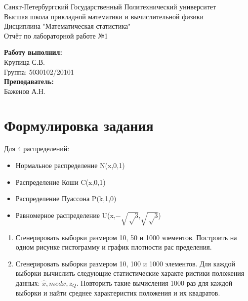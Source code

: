 \documentclass[12pt]{article}
\begin{document}
\begin{titlepage}	

	\begin{center}		

		Санкт-Петербургский Государственный Политехнический университет\\
		Высшая школа прикладной математики и вычислительной физики\\
		Дисциплина "Математическая статистика"\\[6cm]

		\huge {Отчёт по лабораторной работе №1} \\[6cm]


	\end{center} 
	\begin{flushright} 
		\begin{minipage}{0.3\textwidth} 
			\begin{flushleft} 

				\textbf{Работу выполнил:}\\
				{Крупица С.В.}\\
				{Группа:  5030102/20101} \\

				\textbf{Преподаватель:}\\
				{Баженов А.Н.}\\

			\end{flushleft}
		\end{minipage}
	\end{flushright}

	\vfill 
\end{titlepage}

\newpage
\tableofcontents
\newpage
\section{Формулировка задания}
Для 4 распределений:
\begin{itemize}
    \item Нормальное распределение N(x,0,1)
    \item Распределение Коши C(x,0,1)
    \item Распределение Пуассона P(k,1,0)
    \item Равномерное распределение U(x,$-\sqrt{√3}$,$\sqrt{√3}$)
    
\end{itemize}


\begin{enumerate}
    \item  Сгенерировать выборки размером 10, 50 и 1000 элементов.
 Построить на одном рисунке гистограмму и график плотности рас
пределения.
    \item Сгенерировать выборки размером 10, 100 и 1000 элементов.
 Для каждой выборки вычислить следующие статистические характе ристики положения данных: $\hat{x}, med x, z_Q$. 
 Повторить такие вычисления 1000 раз для каждой выборки и найти среднее характеристик положения и их квадратов.
\end{enumerate}
\end{document}
